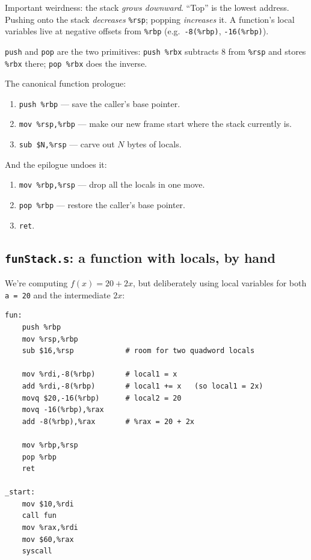 \documentclass[11pt]{article}
\begin{document}
Important weirdness: the stack \emph{grows downward}. ``Top'' is the
lowest address. Pushing onto the stack \emph{decreases}
\texttt{\%rsp}; popping \emph{increases} it. A function's local
variables live at negative offsets from \texttt{\%rbp}
(e.g.\ \texttt{-8(\%rbp)}, \texttt{-16(\%rbp)}).

\texttt{push} and \texttt{pop} are the two primitives:
\texttt{push \%rbx} subtracts 8 from \texttt{\%rsp} and stores
\texttt{\%rbx} there; \texttt{pop \%rbx} does the inverse.

The canonical function prologue:
\begin{enumerate}
  \item \texttt{push \%rbp} --- save the caller's base pointer.
  \item \texttt{mov \%rsp,\%rbp} --- make our new frame start where
    the stack currently is.
  \item \texttt{sub \$N,\%rsp} --- carve out $N$ bytes of locals.
\end{enumerate}

And the epilogue undoes it:
\begin{enumerate}
  \item \texttt{mov \%rbp,\%rsp} --- drop all the locals in one move.
  \item \texttt{pop \%rbp} --- restore the caller's base pointer.
  \item \texttt{ret}.
\end{enumerate}

\subsection*{\texttt{funStack.s}: a function with locals, by hand}

We're computing $f(x) = 20 + 2x$, but deliberately using local
variables for both \texttt{a = 20} and the intermediate $2x$:

\begin{lstlisting}
fun:
    push %rbp
    mov %rsp,%rbp
    sub $16,%rsp            # room for two quadword locals

    mov %rdi,-8(%rbp)       # local1 = x
    add %rdi,-8(%rbp)       # local1 += x   (so local1 = 2x)
    movq $20,-16(%rbp)      # local2 = 20
    movq -16(%rbp),%rax
    add -8(%rbp),%rax       # %rax = 20 + 2x

    mov %rbp,%rsp
    pop %rbp
    ret

_start:
    mov $10,%rdi
    call fun
    mov %rax,%rdi
    mov $60,%rax
    syscall
\end{lstlisting}
\end{document}

